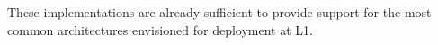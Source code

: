 These implementations are already sufficient to provide support for the most common architectures envisioned for deployment at L1.

